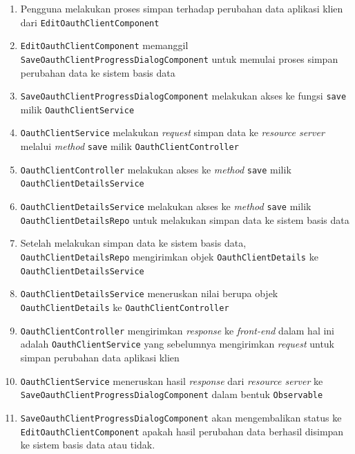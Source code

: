 \documentclass[pdftex,12pt, oneside]{article}
\begin{document}
\begin{itemize}
	\begin{enumerate}
		\item Pengguna melakukan proses simpan terhadap perubahan data aplikasi klien dari \texttt{EditOauthClientComponent}
		
		\item \texttt{EditOauthClientComponent} memanggil \texttt{SaveOauthClientProgressDialogComponent} untuk memulai proses simpan perubahan data ke sistem basis data
		
		\item \texttt{SaveOauthClientProgressDialogComponent} melakukan akses ke fungsi \texttt{save} milik \texttt{OauthClientService}
		
		\item \texttt{OauthClientService} melakukan \textit{request} simpan data ke \textit{resource server} melalui \textit{method} \texttt{save} milik \texttt{OauthClientController}
		
		\item \texttt{OauthClientController} melakukan akses ke \textit{method} \texttt{save} milik \texttt{OauthClientDetailsService}
		
		\item \texttt{OauthClientDetailsService} melakukan akses ke \textit{method} \texttt{save} milik \texttt{OauthClientDetailsRepo} untuk melakukan simpan data ke sistem basis data
		
		\item Setelah melakukan simpan data ke sistem basis data, \texttt{OauthClientDetailsRepo} mengirimkan objek \texttt{OauthClientDetails} ke \texttt{OauthClientDetailsService}
		
		\item \texttt{OauthClientDetailsService} meneruskan nilai berupa objek \texttt{OauthClientDetails} ke \texttt{OauthClientController}
		
		\item \texttt{OauthClientController} mengirimkan \textit{response} ke \textit{front-end} dalam hal ini adalah \texttt{OauthClientService} yang sebelumnya mengirimkan \textit{request} untuk simpan perubahan data aplikasi klien
		
		\item \texttt{OauthClientService} meneruskan hasil \textit{response} dari \textit{resource server} ke \texttt{SaveOauthClientProgressDialogComponent} dalam bentuk \texttt{Observable}
		
		\item \texttt{SaveOauthClientProgressDialogComponent} akan mengembalikan status ke \texttt{EditOauthClientComponent} apakah hasil perubahan data berhasil disimpan ke sistem basis data atau tidak.
		

\end{enumerate}
\end{itemize}
\end{document}
